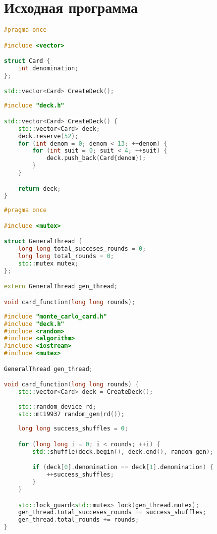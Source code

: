 \section{Исходная программа}

\begin{lstlisting}[language=C++,caption=include/deck.h,captionpos=b]
#pragma once

#include <vector>

struct Card {
    int denomination;
};

std::vector<Card> CreateDeck();
\end{lstlisting}

\begin{lstlisting}[language=C++,caption=src/deck.cpp,captionpos=b]
#include "deck.h"

std::vector<Card> CreateDeck() {
    std::vector<Card> deck;
    deck.reserve(52);
    for (int denom = 0; denom < 13; ++denom) {
        for (int suit = 0; suit < 4; ++suit) {
            deck.push_back(Card{denom});
        }
    }

    return deck;
}
\end{lstlisting}

\begin{lstlisting}[language=C++,caption=include/monte\_carlo\_card.h,captionpos=b]
#pragma once

#include <mutex>

struct GeneralThread {
    long long total_succeses_rounds = 0;
    long long total_rounds = 0;
    std::mutex mutex;
};

extern GeneralThread gen_thread;

void card_function(long long rounds);
\end{lstlisting}

\begin{lstlisting}[language=C++,caption=src/monte\_carlo\_card.cpp,captionpos=b]
#include "monte_carlo_card.h"
#include "deck.h"
#include <random>
#include <algorithm>
#include <iostream>
#include <mutex>

GeneralThread gen_thread;

void card_function(long long rounds) {
    std::vector<Card> deck = CreateDeck();
    
    std::random_device rd;
    std::mt19937 random_gen(rd());
    
    long long success_shuffles = 0;

    for (long long i = 0; i < rounds; ++i) {
        std::shuffle(deck.begin(), deck.end(), random_gen);

        if (deck[0].denomination == deck[1].denomination) {
            ++success_shuffles;
        }
    }

    std::lock_guard<std::mutex> lock(gen_thread.mutex);
    gen_thread.total_succeses_rounds += success_shuffles;
    gen_thread.total_rounds += rounds;
}
\end{lstlisting}

